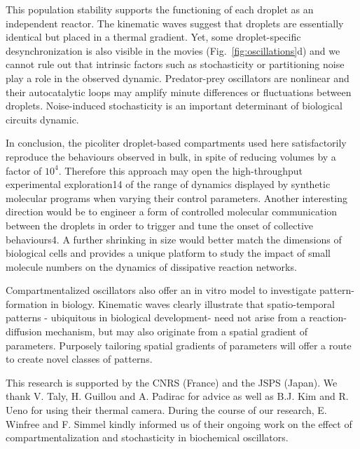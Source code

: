 \documentclass[prl,reprint, amsmath,amssymb,superscriptaddress]{revtex4-1}
\begin{document}
This population stability supports the functioning of each droplet as an independent reactor. The kinematic waves suggest that droplets are essentially identical but placed in a thermal gradient. Yet, some droplet-specific desynchronization is also visible in the movies (Fig.~\ref{fig:oscillations}d) and we cannot rule out that intrinsic factors such as stochasticity or partitioning noise play a role in the observed dynamic. Predator-prey oscillators are nonlinear and their autocatalytic loops may amplify minute differences or fluctuations between droplets. Noise-induced stochasticity is an important determinant of biological circuits dynamic.

	In conclusion, the picoliter droplet-based compartments used here satisfactorily reproduce the behaviours observed in bulk, in spite of reducing volumes by a factor of $10^4$.  Therefore this approach may open the high-throughput experimental exploration14 of the range of dynamics displayed by synthetic molecular programs when varying their control parameters. Another interesting direction would be to engineer a form of controlled molecular communication between the droplets in order to trigger and tune the onset of collective behaviours4.  A further shrinking in size would better match the dimensions of biological cells and provides a unique platform to study the impact of small molecule numbers on the dynamics of dissipative reaction networks. 
	
	Compartmentalized oscillators also offer an in vitro model to investigate pattern-formation in biology. Kinematic waves clearly illustrate that spatio-temporal patterns - ubiquitous in biological development- need not arise from a reaction-diffusion mechanism, but may also originate from a spatial gradient of parameters. Purposely tailoring spatial gradients of parameters will offer a route to create novel classes of patterns.
	
\begin{acknowledgments}
	This research is supported by the CNRS (France) and the JSPS (Japan). We thank V. Taly, H. Guillou and A. Padirac for advice as well as B.J. Kim and R. Ueno for using their thermal camera. During the course of our research, E. Winfree and F. Simmel kindly informed us of their ongoing work on the effect of compartmentalization and stochasticity in biochemical oscillators.
\end{acknowledgments}
\end{document}
